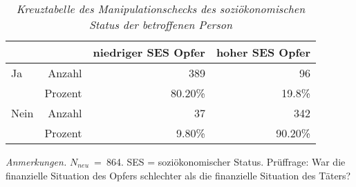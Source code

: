 \begin{table}[htb]
    \caption[Kreuztabelle Manipulationscheck soziökonomischer Status des Opfers]{\textit {Kreuztabelle des Manipulationschecks des soziökonomischen Status der betroffenen Person}} 
    \label{KT_SES}
    \centering
    \begin{adjustbox}{width=10cm} %
    \small
    \begin{tabular}{lrrr}
      \hline
        &   & niedriger SES Opfer & hoher SES Opfer \\
      \hline
    Ja   & Anzahl  & 389      & 96      \\
         & Prozent & 80.20\%  & 19.8\%  \\
    Nein & Anzahl  & 37       & 342     \\
         & Prozent & 9.80\%   & 90.20\% \\
       \hline
    \end{tabular}
    \end{adjustbox}
    
    \begin{tablenotes}
        \item \textit{Anmerkungen.} \( N_{neu} \)~=~864. SES = soziökonomischer Status. Prüffrage: War die finanzielle Situation des Opfers schlechter als die finanzielle Situation des Täters?
      \end{tablenotes}
    \end{table}